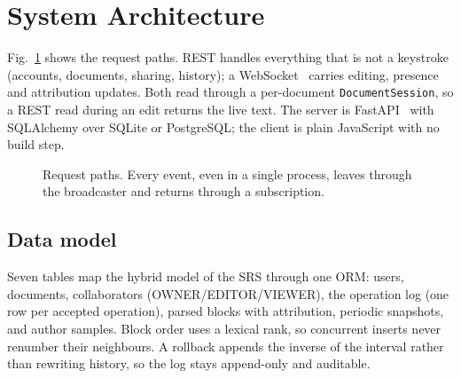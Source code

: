 \documentclass[conference]{IEEEtran}
\begin{document}
\section{System Architecture}
Fig.~\ref{fig:arch} shows the request paths. REST handles everything that is not a keystroke (accounts, documents, sharing, history); a WebSocket~\cite{rfc6455} carries editing, presence and attribution updates. Both read through a per-document \texttt{DocumentSession}, so a REST read during an edit returns the live text. The server is FastAPI~\cite{fastapi} with SQLAlchemy over SQLite or PostgreSQL; the client is plain JavaScript with no build step.

\begin{figure}[t]
\centering
{}
\caption{Request paths. Every event, even in a single process, leaves through the broadcaster and returns through a subscription.}
\label{fig:arch}
\end{figure}

\subsection{Data model}
Seven tables map the hybrid model of the SRS through one ORM: users, documents, collaborators (OWNER/EDITOR/VIEWER), the operation log (one row per accepted operation), parsed blocks with attribution, periodic snapshots, and author samples. Block order uses a lexical rank, so concurrent inserts never renumber their neighbours. A rollback appends the inverse of the interval rather than rewriting history, so the log stays append-only and auditable.
\end{document}
